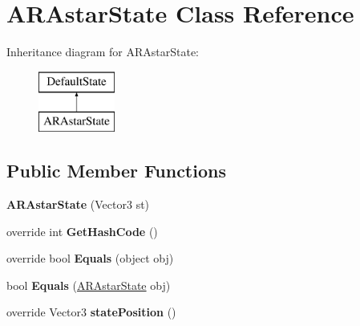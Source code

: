 \hypertarget{class_a_r_astar_state}{\section{A\-R\-Astar\-State Class Reference}
\label{class_a_r_astar_state}
}
Inheritance diagram for A\-R\-Astar\-State\-:\begin{figure}[H]
\begin{center}
\leavevmode
\includegraphics[height=2.000000cm]{class_a_r_astar_state}
\end{center}
\end{figure}
\subsection*{Public Member Functions}
\begin{DoxyCompactItemize}
\item 
\hypertarget{class_a_r_astar_state_aea1aef997b4a38111acaae49ca8b58e7}{{\bfseries A\-R\-Astar\-State} (Vector3 st)}\label{class_a_r_astar_state_aea1aef997b4a38111acaae49ca8b58e7}

\item 
\hypertarget{class_a_r_astar_state_a56f7f9692648f1824f7fbe8b5368c888}{override int {\bfseries Get\-Hash\-Code} ()}\label{class_a_r_astar_state_a56f7f9692648f1824f7fbe8b5368c888}

\item 
\hypertarget{class_a_r_astar_state_a09e066353969e553f2f1f6eaa3c3cd49}{override bool {\bfseries Equals} (object obj)}\label{class_a_r_astar_state_a09e066353969e553f2f1f6eaa3c3cd49}

\item 
\hypertarget{class_a_r_astar_state_ac382fe20a1cdfe2a2ce15cbd377c1c09}{bool {\bfseries Equals} (\hyperlink{class_a_r_astar_state}{A\-R\-Astar\-State} obj)}\label{class_a_r_astar_state_ac382fe20a1cdfe2a2ce15cbd377c1c09}

\item 
\hypertarget{class_a_r_astar_state_a0c13f3ba8101aae8654660f3fea953d5}{override Vector3 {\bfseries state\-Position} ()}\label{class_a_r_astar_state_a0c13f3ba8101aae8654660f3fea953d5}

\end{DoxyCompactItemize}
